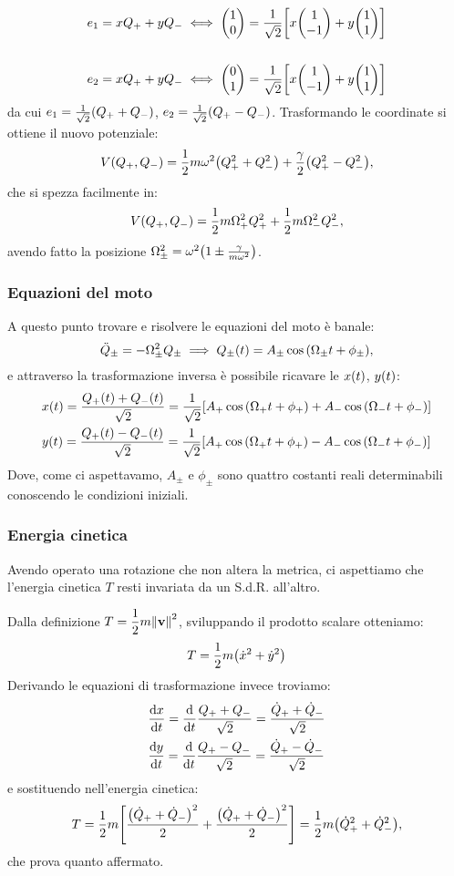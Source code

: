             \begin{align*}
                e_1=xQ_++yQ_- & \iff \mqty(1 \\ 0)=\frac{1}{\sqrt{2}}\qty[x\mqty(1 \\ -1)+y\mqty(1 \\ 1)] \\\\
                e_2=xQ_++yQ_- & \iff \mqty(0 \\ 1)=\frac{1}{\sqrt{2}}\qty[x\mqty(1 \\ -1)+y\mqty(1 \\ 1)] 
            \end{align*}
            da cui $e_1=\frac{1}{\sqrt{2}}\qty(Q_++Q_-)$, $e_2=\frac{1}{\sqrt{2}}\qty(Q_+-Q_-)$. Trasformando le coordinate si ottiene il nuovo potenziale: $$V\qty(Q_+,Q_-)=\frac{1}{2}m\omega^2\qty(Q_+^2+Q_-^2)+\frac{\gamma}{2}\qty(Q_+^2-Q_-^2),$$ che si spezza facilmente in: $$V\qty(Q_+,Q_-)=\frac{1}{2}m\Omega_+^2Q_+^2+\frac{1}{2}m\Omega_-^2Q_-^2,$$ avendo fatto la posizione $\Omega_\pm^2=\omega^2\qty(1\pm\frac{\gamma}{m\omega^2})$.
        \subsubsection{Equazioni del moto}
            A questo punto trovare e risolvere le equazioni del moto \`e banale: $$\ddot{Q}_\pm=-\Omega_\pm^2Q_\pm \implies Q_\pm\qty(t)=A_\pm\cos\qty(\Omega_\pm t+\phi_\pm),$$ e attraverso la trasformazione inversa \`e possibile ricavare le $x\qty(t)$, $y\qty(t)$:
            \begin{align*}
                & x\qty(t)=\frac{Q_+\qty(t)+Q_-\qty(t)}{\sqrt{2}}=\frac{1}{\sqrt{2}}\qty[A_+\cos\qty(\Omega_+t+\phi_+)+A_-\cos\qty(\Omega_-t+\phi_-)] \\
                & y\qty(t)=\frac{Q_+\qty(t)-Q_-\qty(t)}{\sqrt{2}}=\frac{1}{\sqrt{2}}\qty[A_+\cos\qty(\Omega_+t+\phi_+)-A_-\cos\qty(\Omega_-t+\phi_-)]
            \end{align*}
            Dove, come ci aspettavamo, $A_\pm$ e $\phi_\pm$ sono quattro costanti reali determinabili conoscendo le condizioni iniziali.
        \subsubsection{Energia cinetica}
            Avendo operato una rotazione che non altera la metrica, ci aspettiamo che l'energia cinetica $T$ resti invariata da un S.d.R. all'altro. \par Dalla definizione $\displaystyle T=\frac{1}{2}m\norm{\vb{v}}^2$, sviluppando il prodotto scalare otteniamo: $$T=\frac{1}{2}m\qty(\dot{x}^2+\dot{y}^2)$$ Derivando le equazioni di trasformazione invece troviamo:
            \begin{align*}
                &\dv{x}{t}=\dv{t}\frac{Q_++Q_-}{\sqrt{2}}=\frac{\dot{Q}_++\dot{Q}_-}{\sqrt{2}}\\
                &\dv{y}{t}=\dv{t}\frac{Q_+-Q_-}{\sqrt{2}}=\frac{\dot{Q}_+-\dot{Q}_-}{\sqrt{2}}
            \end{align*}
            e sostituendo nell'energia cinetica: $$T=\frac{1}{2}m\qty[\frac{\qty(\dot{Q}_++\dot{Q}_-)^2}{2}+\frac{\qty(\dot{Q}_++\dot{Q}_-)^2}{2}]=\frac{1}{2}m\qty(\dot{Q}_+^2+\dot{Q}_-^2),$$ che prova quanto affermato.
